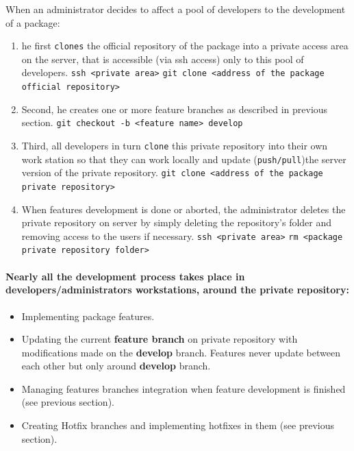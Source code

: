 \documentclass[12pt,a4paper]{article}
\begin{document}
When an administrator decides to affect a pool of developers to the development of a package:
\begin{enumerate}
\item he first \texttt{clones} the official repository of the package into a private access area on the server, that is accessible (via ssh access) only to this pool of developers. 
\linebreak \texttt{ssh <private area>}
\linebreak \texttt{git clone <address of the package official repository>}
\item Second, he creates one or more feature branches as described in previous section.
\linebreak \texttt{git checkout -b <feature name> develop}
\item Third, all developers in turn \texttt{clone} this private repository into their own work station so that they can work locally and update (\texttt{push/pull})the server version of the private repository.
\linebreak \texttt{git clone <address of the package private repository>}
\item When features development is done or aborted, the administrator deletes 
the private repository on server by simply deleting the repository's folder and removing access to the users if necessary.
\linebreak \texttt{ssh <private area>}
\linebreak \texttt{rm <package private repository folder>}
\end{enumerate}

\paragraph{Nearly all the development process takes place in developers/administrators workstations, around the private repository:}
\begin{itemize}
\item Implementing package features.
\item Updating the current \textbf{feature branch} on private repository with modifications made on the \textbf{develop} branch. Features never update between each other but only around \textbf{develop} branch. 
\item Managing features branches integration when feature development is finished (see previous section).
\item Creating Hotfix branches and implementing hotfixes in them (see previous section).
\end{itemize}
\end{document}
